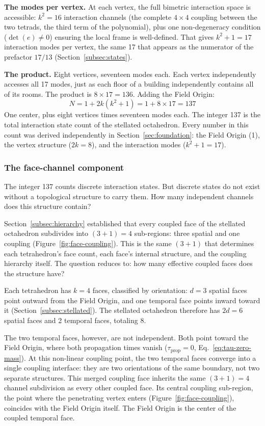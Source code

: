 \documentclass[aps,prd,preprint,superscriptaddress,showpacs,preprintnumbers,amsmath,amssymb,nofootinbib]{revtex4-2}
\begin{document}
\textbf{The modes per vertex.} At each vertex, the full bimetric interaction space is accessible: $k^2 = 16$ interaction channels (the complete $4 \times 4$ coupling between the two tetrads, the third term of the polynomial), plus one non-degeneracy condition ($\det(e) \neq 0$) ensuring the local frame is well-defined. That gives $k^2 + 1 = 17$ interaction modes per vertex, the same 17 that appears as the numerator of the prefactor $17/13$ (Section~\ref{subsec:states}).

\textbf{The product.} Eight vertices, seventeen modes each. Each vertex independently accesses all 17 modes, just as each floor of a building independently contains all of its rooms. The product is $8 \times 17 = 136$. Adding the Field Origin:
\begin{equation*}
N = 1 + 2k(k^2 + 1) = 1 + 8 \times 17 = 137
\end{equation*}
One center, plus eight vertices times seventeen modes each. The integer 137 is the total interaction state count of the stellated octahedron. Every number in this count was derived independently in Section~\ref{sec:foundation}: the Field Origin (1), the vertex structure ($2k = 8$), and the interaction modes ($k^2 + 1 = 17$).

\subsubsection*{The face-channel component}

The integer 137 counts discrete interaction states. But discrete states do not exist without a topological structure to carry them. How many independent channels does this structure contain?

Section~\ref{subsec:hierarchy} established that every coupled face of the stellated octahedron subdivides into $(3{+}1) = 4$ sub-regions: three spatial and one coupling (Figure~\ref{fig:face-coupling}). This is the same $(3{+}1)$ that determines each tetrahedron's face count, each face's internal structure, and the coupling hierarchy itself. The question reduces to: how many effective coupled faces does the structure have?

Each tetrahedron has $k = 4$ faces, classified by orientation: $d = 3$ spatial faces point outward from the Field Origin, and one temporal face points inward toward it (Section~\ref{subsec:stellated}). The stellated octahedron therefore has $2d = 6$ spatial faces and 2 temporal faces, totaling 8.

The two temporal faces, however, are not independent. Both point toward the Field Origin, where both propagation times vanish ($\tau_{\text{prop}} = 0$, Eq.~\ref{eq:tau-zero-mass}). At this non-linear coupling point, the two temporal faces converge into a single coupling interface: they are two orientations of the same boundary, not two separate structures. This merged coupling face inherits the same $(3{+}1) = 4$ channel subdivision as every other coupled face. Its central coupling sub-region, the point where the penetrating vertex enters (Figure~\ref{fig:face-coupling}), coincides with the Field Origin itself. The Field Origin is the center of the coupled temporal face.
\end{document}
